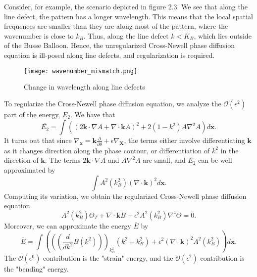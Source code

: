 \documentclass[12pt]{article}
\numberwithin{equation}{section}
\begin{document}
Consider, for example, the scenario depicted in figure 2.3. We see that along the line defect, the pattern has a longer wavelength. This means that the local spatial frequences are smaller than they are along most of the pattern, where the wavenumber is close to $k_B$. Thus, along the line defect $k<K_B$, which lies outside of the Busse Balloon. Hence, the unregularized Cross-Newell phase diffusion equation is ill-posed along line defects, and regularization is required.
\begin{figure}
\centering
\texttt{[image: wavenumber\_mismatch.png]}
\caption{Change in wavelength along line defects}
\end{figure}
\par To regularize the Cross-Newell phase diffusion equation, we analyze the $\mathcal{O}(\epsilon^2)$ part of the energy, $\overline{E_2}$.
We have that
\begin{equation}
    \overline{E_2} = \int \left((2\bm{k}\cdot \nabla A+\nabla \cdot \bm{k}A)^2+2(1-k^2)A\nabla^2A\right)d\bm{x}.
\end{equation}
It turns out that since $\nabla_{\bm{x}} = \bm{k}\frac{\partial}{\partial \theta}+\epsilon \nabla_{\bm{X}}$, the terms either involve differentiating $\bm{k}$ as it changes direction along the phase contour, or differentiation of $k^2$ in the direction of $\bm{k}$. The terms $2\bm{k}\cdot \nabla A$ and $A\nabla^2A$ are small, and $\overline{E_2}$ can be well approximated by
\begin{equation}
    \int A^2(k_B^2)(\nabla \cdot \bm{k})^2d\bm{x}.
\end{equation}
Computing its variation, we obtain the regularized Cross-Newell phase diffusion equation
\begin{equation}
    A^2(k_B^2)\Theta_T + \nabla \cdot \bm{k}B + \epsilon^2 A^2(k_B^2)\nabla^4\Theta = 0.
\end{equation}
Moreover, we can approximate the energy $\overline{E}$ by
\begin{equation}
\overline{E} = \int \left(\left( (\frac{d}{dk^2}B(k^2))\right)_{k_B^2}(k^2-k^2_B) + \epsilon^2 (\nabla \cdot \bm{k})^2A^2(k_B^2)\right)d\bm{x}.
\end{equation}
The $\mathcal{O}(\epsilon^0)$ contribution is the "strain" energy, and the $\mathcal{O}(\epsilon^2)$ contribution is the "bending" energy.
\end{document}

